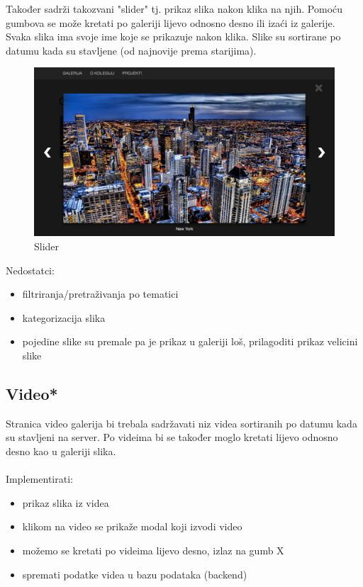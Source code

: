 \documentclass[]{article}
\begin{document}
Također sadrži takozvani "slider" tj. prikaz slika nakon klika na njih. Pomoću gumbova se može kretati po galeriji lijevo odnosno desno ili izaći iz galerije. Svaka slika ima svoje ime koje se prikazuje nakon klika. Slike su sortirane po datumu kada su stavljene (od najnovije prema starijima).
\\
\begin{figure}[h]
	\centering
	\includegraphics[scale=0.23]{slider}
	\caption{Slider}
	\label{fig:mesh1}
\end{figure}

Nedostatci:
\begin{itemize}
	\item filtriranja/pretraživanja po tematici
	\item kategorizacija slika
	\item pojedine slike su premale pa je prikaz u galeriji loš, prilagoditi prikaz velicini slike
\end{itemize}
\newpage
\subsection{Video*}
Stranica video galerija bi trebala sadržavati niz videa sortiranih po datumu kada su stavljeni na server. Po videima bi se također moglo kretati lijevo odnosno desno kao u galeriji slika.
\\
\\
Implementirati:
\begin{itemize}
	\item prikaz slika iz videa
	\item klikom na video se prikaže modal koji izvodi video
	\item možemo se kretati po videima lijevo desno, izlaz na gumb X
	\item spremati podatke videa u bazu podataka (backend)
\end{itemize}
\end{document}
